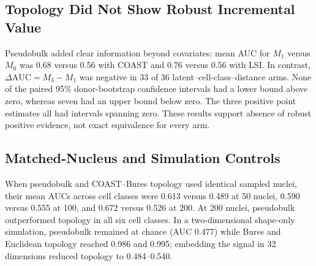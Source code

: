 
\subsection{Topology Did Not Show Robust Incremental Value}
Pseudobulk added clear information beyond covariates: mean AUC for $M_1$ versus $M_0$ was 0.68 versus 0.56 with COAST and 0.76 versus 0.56 with LSI. In contrast, $\Delta\mathrm{AUC}=M_3-M_1$ was negative in 33 of 36 latent--cell-class--distance arms. None of the paired 95\% donor-bootstrap confidence intervals had a lower bound above zero, whereas seven had an upper bound below zero. The three positive point estimates all had intervals spanning zero. These results support absence of robust positive evidence, not exact equivalence for every arm.

\subsection{Matched-Nucleus and Simulation Controls}
When pseudobulk and COAST--Bures topology used identical sampled nuclei, their mean AUCs across cell classes were 0.613 versus 0.489 at 50 nuclei, 0.590 versus 0.555 at 100, and 0.672 versus 0.526 at 200. At 200 nuclei, pseudobulk outperformed topology in all six cell classes. In a two-dimensional shape-only simulation, pseudobulk remained at chance (AUC 0.477) while Bures and Euclidean topology reached 0.986 and 0.995; embedding the signal in 32 dimensions reduced topology to 0.484--0.540.
